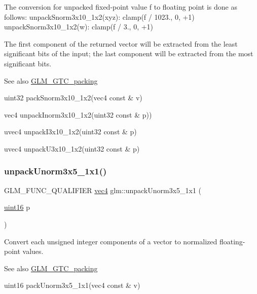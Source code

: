The conversion for unpacked fixed-\/point value f to floating point is done as follows\+: unpack\+Snorm3x10\+\_\+1x2(xyz)\+: clamp(f / 1023., 0, +1) unpack\+Snorm3x10\+\_\+1x2(w)\+: clamp(f / 3., 0, +1)

The first component of the returned vector will be extracted from the least significant bits of the input; the last component will be extracted from the most significant bits.

\begin{DoxySeeAlso}{See also}
\hyperlink{group__gtc__packing}{G\+L\+M\+\_\+\+G\+T\+C\+\_\+packing} 

uint32 pack\+Snorm3x10\+\_\+1x2(vec4 const \& v) 

vec4 unpack\+Inorm3x10\+\_\+1x2(uint32 const \& p)) 

uvec4 unpack\+I3x10\+\_\+1x2(uint32 const \& p) 

uvec4 unpack\+U3x10\+\_\+1x2(uint32 const \& p) 
\end{DoxySeeAlso}
\mbox{\label{group__gtc__packing_gaab3b476e8f320670717fd518f350ce28}} 
\subsubsection{\texorpdfstring{unpack\+Unorm3x5\+\_\+1x1()}{unpackUnorm3x5\_1x1()}}
{\footnotesize\ttfamily G\+L\+M\+\_\+\+F\+U\+N\+C\+\_\+\+Q\+U\+A\+L\+I\+F\+I\+ER \hyperlink{group__core__types_ga5881b1b022d7fd1b7218f5916532dd02}{vec4} glm\+::unpack\+Unorm3x5\+\_\+1x1 (\begin{DoxyParamCaption}\item[{\hyperlink{group__gtc__type__precision_gad8c2939e1fdd8e5828b31d95c52255d5}{uint16}}]{p }\end{DoxyParamCaption})}

Convert each unsigned integer components of a vector to normalized floating-\/point values.

\begin{DoxySeeAlso}{See also}
\hyperlink{group__gtc__packing}{G\+L\+M\+\_\+\+G\+T\+C\+\_\+packing} 

uint16 pack\+Unorm3x5\+\_\+1x1(vec4 const \& v) 
\end{DoxySeeAlso}
\mbox{\label{group__gtc__packing_gafb2b502bc406031a5618ce930139a9e3}} 
